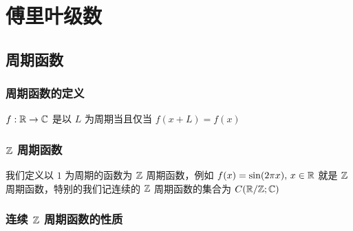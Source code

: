 \newcommand{\CRZ}{C(\R / \Z; \C)}
\chapter{傅里叶级数}

\section{周期函数}

\subsection{周期函数的定义}

$f: \mathbb{R} \to \mathbb{C}$ 是以 $L$ 为周期当且仅当 $f(x+L) = f(x)$

\subsection{ $\mathbb{Z}$ 周期函数}

我们定义以 $1$ 为周期的函数为 $\mathbb{Z}$ 周期函数，例如 $f(x) = \sin(2\pi x),\, x \in \mathbb{R}$ 就是 $\mathbb{Z}$ 周期函数，特别的我们记连续的 $\mathbb{Z}$ 周期函数的集合为
$\CRZ$

\subsection{连续 $\mathbb{Z}$ 周期函数的性质}

